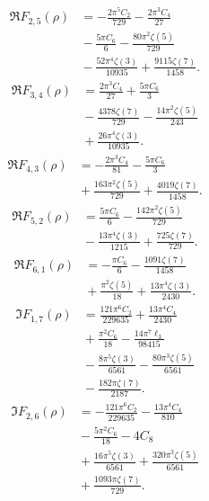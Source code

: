 \begin{align*}
\Re F_{2,5}(\rho) &=-\frac{2 \pi^{5} C_{2}}{729}-\frac{2 \pi^{3} C_{4}}{27} \\
 &{}-\frac{5 \pi C_{6}}{6}-\frac{80 \pi^{2} \zeta\left(5\right)}{729} \\
 &{}-\frac{52 \pi^{4} \zeta\left(3\right)}{10935}+\frac{9115 \zeta\left(7\right)}{1458}.
\end{align*}
\begin{align*}
\Re F_{3,4}(\rho) &=\frac{2 \pi^{3} C_{4}}{27}+\frac{5 \pi C_{6}}{3} \\
 &{}-\frac{4378 \zeta\left(7\right)}{729}-\frac{14 \pi^{2} \zeta\left(5\right)}{243} \\
 &{}+\frac{26 \pi^{4} \zeta\left(3\right)}{10935}.
\end{align*}
\begin{align*}
\Re F_{4,3}(\rho) &=-\frac{2 \pi^{3} C_{4}}{81}-\frac{5 \pi C_{6}}{3} \\
 &{}+\frac{163 \pi^{2} \zeta\left(5\right)}{729}+\frac{4019 \zeta\left(7\right)}{1458}.
\end{align*}
\begin{align*}
\Re F_{5,2}(\rho) &=\frac{5 \pi C_{6}}{6}-\frac{142 \pi^{2} \zeta\left(5\right)}{729} \\
 &{}-\frac{13 \pi^{4} \zeta\left(3\right)}{1215}+\frac{725 \zeta\left(7\right)}{729}.
\end{align*}
\begin{align*}
\Re F_{6,1}(\rho) &=-\frac{\pi C_{6}}{6}-\frac{1091 \zeta\left(7\right)}{1458} \\
 &{}+\frac{\pi^{2} \zeta\left(5\right)}{18}+\frac{13 \pi^{4} \zeta\left(3\right)}{2430}.
\end{align*}
\begin{align*}
\Im F_{1,7}(\rho) &=\frac{121 \pi^{6} C_{2}}{229635}+\frac{13 \pi^{4} C_{4}}{2430} \\
 &{}+\frac{\pi^{2} C_{6}}{18}-\frac{14 \pi^{7} \ell_{3}}{98415} \\
 &{}-\frac{8 \pi^{5} \zeta\left(3\right)}{6561}-\frac{80 \pi^{3} \zeta\left(5\right)}{6561} \\
 &{}-\frac{182 \pi \zeta\left(7\right)}{2187}.
\end{align*}
\begin{align*}
\Im F_{2,6}(\rho) &=-\frac{121 \pi^{6} C_{2}}{229635}-\frac{13 \pi^{4} C_{4}}{810} \\
 &{}-\frac{5 \pi^{2} C_{6}}{18}-4 C_{8} \\
 &{}+\frac{16 \pi^{5} \zeta\left(3\right)}{6561}+\frac{320 \pi^{3} \zeta\left(5\right)}{6561} \\
 &{}+\frac{1093 \pi \zeta\left(7\right)}{729}.
\end{align*}
